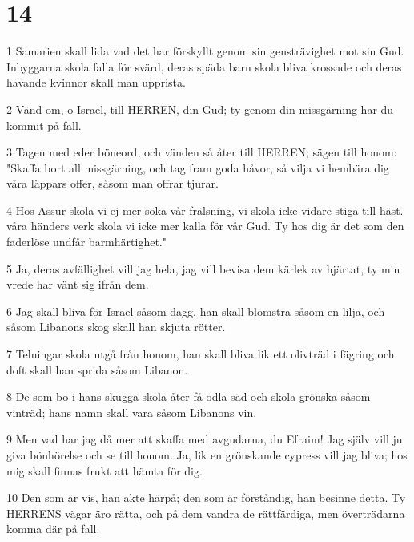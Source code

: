\chapter{14}

\par 1 Samarien skall lida vad det har förskyllt genom sin gensträvighet mot sin Gud. Inbyggarna skola falla för svärd, deras späda barn skola bliva krossade och deras havande kvinnor skall man upprista.
\par 2 Vänd om, o Israel, till HERREN, din Gud; ty genom din missgärning har du kommit på fall.
\par 3 Tagen med eder böneord, och vänden så åter till HERREN; sägen till honom: "Skaffa bort all missgärning, och tag fram goda håvor, så vilja vi hembära dig våra läppars offer, såsom man offrar tjurar.
\par 4 Hos Assur skola vi ej mer söka vår frälsning, vi skola icke vidare stiga till häst. våra händers verk skola vi icke mer kalla för vår Gud. Ty hos dig är det som den faderlöse undfår barmhärtighet."
\par 5 Ja, deras avfällighet vill jag hela, jag vill bevisa dem kärlek av hjärtat, ty min vrede har vänt sig ifrån dem.
\par 6 Jag skall bliva för Israel såsom dagg, han skall blomstra såsom en lilja, och såsom Libanons skog skall han skjuta rötter.
\par 7 Telningar skola utgå från honom, han skall bliva lik ett olivträd i fägring och doft skall han sprida såsom Libanon.
\par 8 De som bo i hans skugga skola åter få odla säd och skola grönska såsom vinträd; hans namn skall vara såsom Libanons vin.
\par 9 Men vad har jag då mer att skaffa med avgudarna, du Efraim! Jag själv vill ju giva bönhörelse och se till honom. Ja, lik en grönskande cypress vill jag bliva; hos mig skall finnas frukt att hämta för dig.
\par 10 Den som är vis, han akte härpå; den som är förståndig, han besinne detta. Ty HERRENS vägar äro rätta, och på dem vandra de rättfärdiga, men överträdarna komma där på fall.


